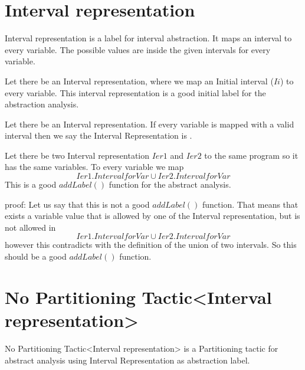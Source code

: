 \section{Interval representation}
\begin{definition}
Interval representation is a label for interval abstraction. It maps an interval to every variable. The possible values are inside the given intervals for every variable.
\end{definition}

\begin{theorem}	
	Let there be an Interval representation, where we map an Initial interval ($Ii$) to every variable. This interval representation is a good initial label for the abstraction analysis.
\end{theorem}

\begin{definition}
	Let there be an Interval representation. If every variable is mapped with a valid interval then we say the Interval Representation is .
\end{definition}

\begin{theorem}	
	Let there be two Interval representation $Ier1$ and $Ier2$ to the same program so it has the same variables. To every variable we map \[Ier1.IntervalforVar \cup Ier2.IntervalforVar\]This is a good $addLabel()$ function for the abstract analysis.
\end{theorem}
	
	{proof:} Let us say that this is not a good $addLabel()$ function. That means that exists a variable value that is allowed by one of the Interval representation, but is not allowed in \[Ier1.IntervalforVar \cup Ier2.IntervalforVar\] however this contradicts with the definition of the union of two intervals. So this should be a good $addLabel()$ function.	

\section{No Partitioning Tactic<Interval representation>}

\begin{definition}
	No Partitioning Tactic<Interval representation> is a Partitioning tactic for abstract analysis using Interval Representation as abstraction label.
\end{definition}

